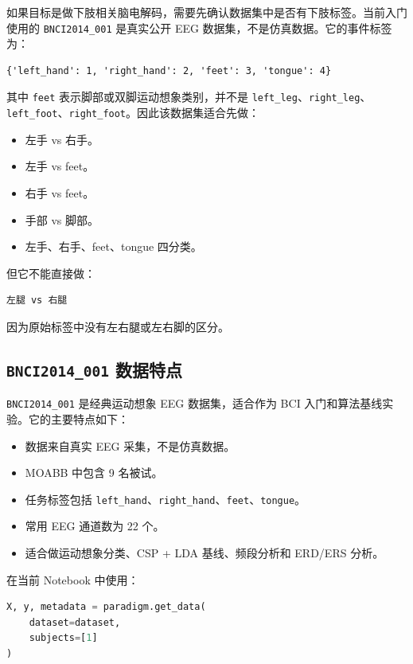\documentclass[UTF8,a4paper,12pt]{ctexart}
\begin{document}
如果目标是做下肢相关脑电解码，需要先确认数据集中是否有下肢标签。当前入门使用的 \texttt{BNCI2014\_001} 是真实公开 EEG 数据集，不是仿真数据。它的事件标签为：

\begin{lstlisting}[language={}]
{'left_hand': 1, 'right_hand': 2, 'feet': 3, 'tongue': 4}
\end{lstlisting}

其中 \texttt{feet} 表示脚部或双脚运动想象类别，并不是 \texttt{left\_leg}、\texttt{right\_leg}、\texttt{left\_foot}、\texttt{right\_foot}。因此该数据集适合先做：

\begin{itemize}
  \item 左手 vs 右手。
  \item 左手 vs feet。
  \item 右手 vs feet。
  \item 手部 vs 脚部。
  \item 左手、右手、feet、tongue 四分类。
\end{itemize}

但它不能直接做：

\begin{lstlisting}[language={}]
左腿 vs 右腿
\end{lstlisting}

因为原始标签中没有左右腿或左右脚的区分。

\subsection{\texttt{BNCI2014\_001} 数据特点}

\texttt{BNCI2014\_001} 是经典运动想象 EEG 数据集，适合作为 BCI 入门和算法基线实验。它的主要特点如下：

\begin{itemize}
  \item 数据来自真实 EEG 采集，不是仿真数据。
  \item MOABB 中包含 9 名被试。
  \item 任务标签包括 \texttt{left\_hand}、\texttt{right\_hand}、\texttt{feet}、\texttt{tongue}。
  \item 常用 EEG 通道数为 22 个。
  \item 适合做运动想象分类、CSP + LDA 基线、频段分析和 ERD/ERS 分析。
\end{itemize}

在当前 Notebook 中使用：

\begin{lstlisting}[language=Python]
X, y, metadata = paradigm.get_data(
    dataset=dataset,
    subjects=[1]
)
\end{lstlisting}
\end{document}
